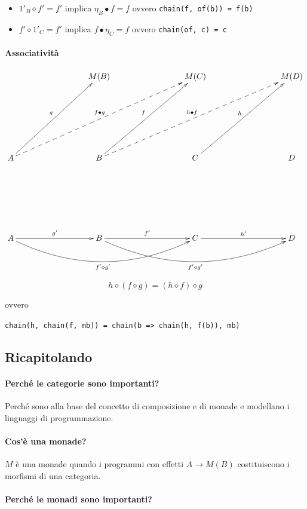 \documentclass[12pt]{article}
\theoremstyle{definition}
\begin{document}
\begin{itemize}
  \item $1'_B \diamond f' = f'$ implica $\eta_B \bullet f = f$ ovvero \texttt{chain(f, of(b)) = f(b)}
  \item $f' \diamond 1'_C = f'$ implica $f \bullet \eta_C = f$ ovvero \texttt{chain(of, c) = c}
\end{itemize}

\paragraph{Associatività}

\[
\xymatrixrowsep{3cm}
\xymatrixcolsep{3cm}
\xymatrix{
  & M(B) & M(C) & M(D) \\
  A \ar[ur]^g \ar@{-->}[urr]^{f \bullet g} & B \ar[ur]^f \ar@{-->}[urr]^{h \bullet f} & C \ar[ur]^h & D \\
  A \ar[r]^{g'} \ar@/_1cm/[rr]_{f' \diamond g'} & B \ar[r]^{f'} \ar@/_1cm/[rr]_{f' \diamond g'} & C \ar[r]^{h'} & D
}
\]

$$
h \diamond (f \diamond g) = (h \diamond f) \diamond g
$$

ovvero

\begin{center}
\texttt{chain(h, chain(f, mb)) = chain(b => chain(h, f(b)), mb)}
\end{center}

\subsection{Ricapitolando}

\paragraph{Perché le categorie sono importanti?}

Perché sono alla base del concetto di composizione e di monade e modellano i linguaggi di programmazione.

\paragraph{Cos'è una monade?}

$M$ è una monade quando i programmi con effetti $A \rightarrow M(B)$ costituiscono i morfismi di una categoria.

\paragraph{Perché le monadi sono importanti?}
\end{document}
